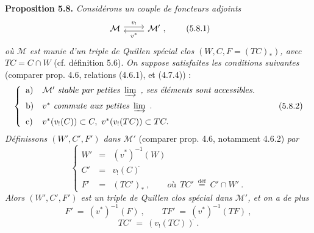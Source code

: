 \documentclass[11pt]{article}
\newcommand{\msp}[1]{\marginpar{\footnotesize [#1]}}
\newcommand{\defeq}{\overset{\text{déf}}{=}}
\newcommand{\cl}{^{\tilde{}}}%
\begin{document}
\msp{page 91}
\textbf{Proposition 5.8.} \textit{Considérons un couple de foncteurs adjoints}
\[
\begin{tikzcd}
\mathcal{M} \arrow[r, shift left, "v_!"] & \mathcal{M}' \arrow[l, shift left, "v^*"] \ ,
\end{tikzcd}
\tag*{(5.8.1)}
\]
\textit{où $\mathcal{M}$ est munie d'un triple de Quillen spécial clos $(W, C, F = (TC)_*)$, avec $TC = C \cap W$} (cf. définition 5.6). \textit{On suppose satisfaites les conditions suivantes} (comparer prop. 4.6, relations (4.6.1), et (4.7.4)) :
\[
\left\{
\begin{array}{ll}
\text{a)} & \mathcal{M}' \ \textit{stable par petites}\ \varinjlim\ \textit{, ses éléments sont accessibles.}\\[1.5ex]
\text{b)} & v^* \ \textit{commute aux petites}\ \varinjlim\ .\\[1.5ex]
\text{c)} & v^*(v_!(C)) \subset C,\ v^*(v_!(TC)) \subset TC.
\end{array}
\right.
\tag*{(5.8.2)}
\]
\textit{Définissons $(W', C', F')$ dans $\mathcal{M}'$} (comparer prop. 4.6, notamment 4.6.2) \textit{par}
\[
\left\{
\begin{array}{lcl}
W' & = & (v^*)^{-1}(W)\\[1ex]
C' & = & v_!(C)\cl\\[1ex]
F' & = & (TC')_*\ , \qquad \textit{où}\ \ TC' \ \defeq \ C' \cap W'\ .
\end{array}
\right.
\tag*{(5.8.3)}
\]
\textit{Alors $(W', C', F')$ est un triple de Quillen clos spécial dans $\mathcal{M}'$, et on a de plus}
\[
F' \ = \ (v^*)^{-1}(F)\ , \qquad TF' \ = \ (v^*)^{-1}(TF)\ ,
\tag*{(5.8.4)}
\]
\[
TC' \ = \ (v_!(TC))\cl\ .
\tag*{(5.8.5)}
\]
\end{document}
